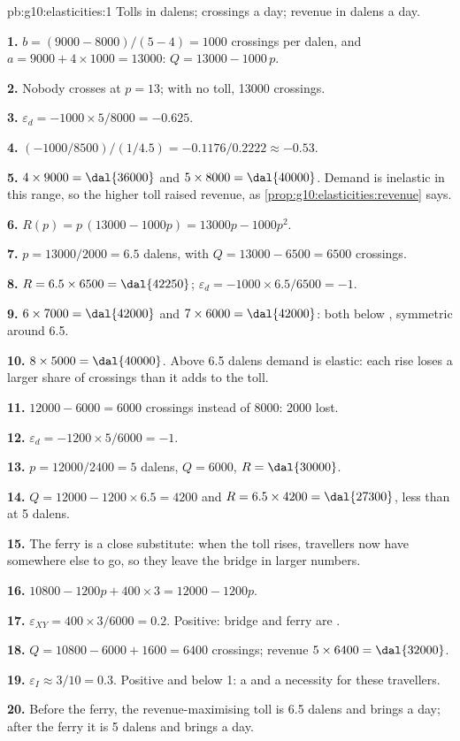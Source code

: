\begin{solution}{pb:g10:elasticities:1}
Tolls in dalens; crossings a day; revenue in dalens a day.

\textbf{1.} $b = (9000 - 8000)/(5 - 4) = 1000$ crossings per dalen, and $a = 9000 + 4 \times 1000 = 13000$: $Q = 13000 - 1000\,p$.

\textbf{2.} Nobody crosses at $p = 13$; with no toll, \num{13000} crossings.

\textbf{3.} $\varepsilon_d = -1000 \times 5/8000 = -0.625$.

\textbf{4.} $(-1000/8500)/(1/4.5) = -0.1176/0.2222 \approx -0.53$.

\textbf{5.} $4 \times 9000 = \text{\dal{36000}}$ and $5 \times 8000 = \text{\dal{40000}}$. Demand is inelastic in this range, so the higher toll raised revenue, as
\cref{prop:g10:elasticities:revenue} says.

\textbf{6.} $R(p) = p\,(13000 - 1000p) = 13000p - 1000p^2$.

\textbf{7.} $p = 13000/2000 = 6.5$ dalens, with $Q = 13000 - 6500 = 6500$ crossings.

\textbf{8.} $R = 6.5 \times 6500 = \text{\dal{42250}}$; $\varepsilon_d = -1000 \times 6.5/6500 = -1$.

\textbf{9.} $6 \times 7000 = \text{\dal{42000}}$ and $7 \times 6000 = \text{\dal{42000}}$: both below , symmetric around 6.5.

\textbf{10.} $8 \times 5000 = \text{\dal{40000}}$. Above 6.5 dalens demand is elastic: each rise loses a larger share of crossings than it adds to the toll.

\textbf{11.} $12000 - 6000 = 6000$ crossings instead of \num{8000}: \num{2000} lost.

\textbf{12.} $\varepsilon_d = -1200 \times 5/6000 = -1$.

\textbf{13.} $p = 12000/2400 = 5$ dalens, $Q = 6000$, $R = \text{\dal{30000}}$.

\textbf{14.} $Q = 12000 - 1200 \times 6.5 = 4200$ and $R = 6.5 \times 4200 = \text{\dal{27300}}$,  less than at 5 dalens.

\textbf{15.} The ferry is a close substitute: when the toll rises, travellers now have somewhere else to go, so they leave the bridge in larger numbers.

\textbf{16.} $10800 - 1200p + 400 \times 3 = 12000 - 1200p$.

\textbf{17.} $\varepsilon_{XY} = 400 \times 3/6000 = 0.2$. Positive: bridge and ferry are .

\textbf{18.} $Q = 10800 - 6000 + 1600 = 6400$ crossings; revenue $5 \times 6400 = \text{\dal{32000}}$.

\textbf{19.} $\varepsilon_I \approx 3/10 = 0.3$. Positive and below 1: a  and a necessity for these travellers.

\textbf{20.} Before the ferry, the revenue-maximising toll is 6.5 dalens and brings  a day; after the ferry it is 5 dalens and brings  a
day.
\end{solution}
